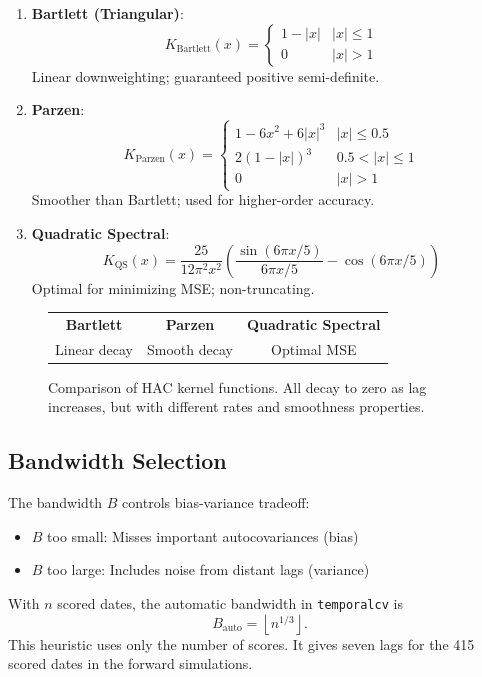 \begin{enumerate}
    \item \textbf{Bartlett (Triangular)}:
    \[
    K_{\text{Bartlett}}(x) = \begin{cases} 1 - |x| & |x| \leq 1 \\ 0 & |x| > 1 \end{cases}
    \]
    Linear downweighting; guaranteed positive semi-definite.

    \item \textbf{Parzen}:
    \[
    K_{\text{Parzen}}(x) = \begin{cases}
    1 - 6x^2 + 6|x|^3 & |x| \leq 0.5 \\
    2(1-|x|)^3 & 0.5 < |x| \leq 1 \\
    0 & |x| > 1
    \end{cases}
    \]
    Smoother than Bartlett; used for higher-order accuracy.

    \item \textbf{Quadratic Spectral}:
    \[
    K_{\text{QS}}(x) = \frac{25}{12\pi^2 x^2}\left(\frac{\sin(6\pi x/5)}{6\pi x/5} - \cos(6\pi x/5)\right)
    \]
    Optimal for minimizing MSE; non-truncating.
\end{enumerate}

\begin{figure}[htbp]
\centering
\begin{tabular}{ccc}
\textbf{Bartlett} & \textbf{Parzen} & \textbf{Quadratic Spectral} \\
Linear decay & Smooth decay & Optimal MSE
\end{tabular}
\caption{Comparison of HAC kernel functions. All decay to zero as lag increases, but with different rates and smoothness properties.}
\label{fig:kernel_comparison}
\end{figure}

\subsection{Bandwidth Selection}

The bandwidth $B$ controls bias-variance tradeoff:
\begin{itemize}
    \item $B$ too small: Misses important autocovariances (bias)
    \item $B$ too large: Includes noise from distant lags (variance)
\end{itemize}

\begin{definition}
\label{def:optimal_bandwidth}
With $n$ scored dates, the automatic bandwidth in \texttt{temporalcv} is
\begin{equation}
B_{\mathrm{auto}} = \left\lfloor n^{1/3} \right\rfloor .
\end{equation}
This heuristic uses only the number of scores. It gives seven lags for the 415 scored dates in the forward simulations.
\end{definition}

